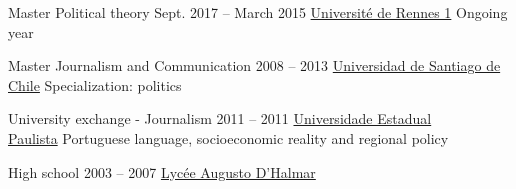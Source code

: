 \begin{yearlist}

\item[Master Political theory]{Sept. 2017 -- March 2015}
     {
     \href{https://formations.univ-rennes1.fr/formations/master-2-theorie-politique}{Université de Rennes 1}
     }
     {Ongoing year}
                        
                        

\item[Master Journalism and Communication]{2008 -- 2013}
     {
     \href{http://periodismo.usach.cl/} {Universidad de Santiago de Chile}
     }
     {Specialization: politics}


\item[University exchange - Journalism]{2011 -- 2011}
     {
     \href{http://www.unesp.br/} {Universidade Estadual \\ Paulista}
     }
     {Portuguese language, socioeconomic reality and regional policy}
     
     
\item[High school ]{2003 \hspace{-0.06cm}-- \hspace{-0.06cm}2007}
     {
     \href{www.liceoaugustodhalmar.cl/liceo}{Lycée Augusto D'Halmar}
     }
		 {}		     


\end{yearlist}





%
%



